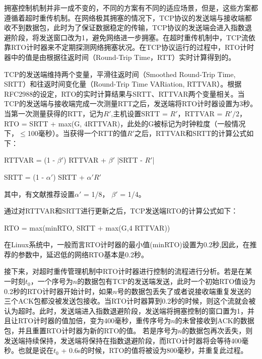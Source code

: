 拥塞控制机制并非一成不变的，不同的方案有不同的适应场景，但是，这些方案都遵循着超时重传机制。在网络极其拥塞的情况下，TCP协议的发送端与接收端都收不到数据包，此时为了保证数据稳定的传输，TCP协议的发送端会进入指数退避阶段，将发送窗口改为1，避免网络进一步拥塞。在超时重传机制中，TCP流依靠RTO计时器来不定期探测网络拥塞状况。在TCP协议运行的过程中，RTO计时器中的值是由根据往返时间（Round-Trip Time，RTT）实时计算得到的。

TCP的发送端维持两个变量，平滑往返时间（Smoothed Round-Trip Time, SRTT）和往返时间变化量（Round-Trip Time VARiation, RTTVAR）。根据RFC2988\cite{2000Computing}的设定，RTO的实时计算结果与SRTT、RTTVAR两个变量相关。当TCP的发送端与接收端完成一次测量RTT之后，发送端将RTO计时器设置为3秒。
当第一次测量获得的RTT，记为$R'$,主机设置SRTT = $R'$，RTTVAR = $R' / 2$，RTO = SRTT + max(G, 4RTTVAR)，此处的G被标记为时钟粒度（一般情况下，$\leq$100毫秒）。当获得一个RTT的值$R'$之后，RTTVAR和SRTT的计算公式如下：

\begin{center}
    RTTVAR = (1 - $\beta '$) RTTVAR + $\beta '$ |SRTT - $R'$|
\vspace{-0.1in}
\end{center}

\begin{center}
    SRTT = (1 - $\alpha '$) SRTT + $\alpha ' R'$
\end{center}

其中，有文献\cite{Jacobson1988Congestion}推荐设置$\alpha '$ = 1/8， $\beta '$ = 1/4。


通过对RTTVAR和SRTT进行更新之后，TCP发送端RTO的计算公式如下：
\begin{center}
    RTO = max(minRTO, SRTT + max(G,4 RTTVAR))
\end{center}

在Linux系统中，一般而言RTO计时器的最小值(minRTO)设置为0.2秒,因此，在推荐的参数中，延迟低的网络RTO基本是0.2秒。

接下来，对超时重传管理机制中RTO计时器进行控制的流程进行分析。若是在某一时刻$t_0$，一个序号为$n$的数据包有TCP的发送端发送，此时一个初始RTO值设为0.2秒的RTO计时器开始计时，如果$n$号的数据包丢失了或者说接收端重复发送的三个ACK包都没被发送包接收。当RTO计时器算到0.2秒的时候，则这个流就会被认为超时。此时，发送端进入指数退避阶段，发送端将拥塞控制的窗口置为1，并且让RTO计时器的值加倍，变为400毫秒，重传序号为$n$的未曾接收到ACK的数据包，并且重置RTO计时器为新的RTO的值。
若是序号为$n$的数据包再次丢失，则发送端持续保持，发送端将保持在指数退避阶段，而RTO计时器将会等待400毫秒。也就是说在$t_0$ + 0.6s的时候，RTO的值将被设为800毫秒，并重复此过程。

